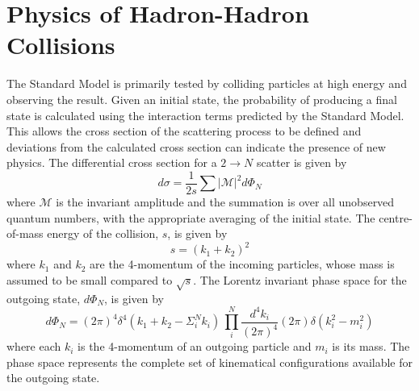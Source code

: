 \section{Physics of Hadron-Hadron Collisions}

The Standard Model is primarily tested by colliding particles at high energy and observing the result. Given an initial state, the probability of producing a final state is calculated using the interaction terms predicted by the Standard Model. This allows 
the cross section of the scattering process 
to be defined 
and deviations from the calculated cross section can indicate the presence of new physics. The differential cross section for a $2\rightarrow N$ scatter is given by
\begin{equation} \label{simplexs}
d \sigma = \frac{1}{2s} \sum |\mathcal{M}|^2 d\Phi_N
\end{equation}
where $\mathcal{M}$ is the invariant amplitude and the summation is over all unobserved quantum numbers, with the appropriate averaging of the initial state. The centre-of-mass energy of the collision, $s$, is given by
\begin{equation}
s= \left(k_1 + k_2 \right)^2
\end{equation}
where $k_1$ and $k_2$ are the 4-momentum of the incoming particles, whose mass is assumed to be small compared to $\sqrt{s}$. 
The Lorentz invariant phase space for the outgoing state, $d\Phi_N$, is given by
\begin{equation}
d\Phi_N = \left(2\pi \right)^4 \delta^4\left(k_{1} + k_2 - \Sigma_i^N k_i \right) \, 
\prod_{i}^{N} \frac{d^4 k_i}{\left(2\pi \right)^4} \left(2\pi\right) \delta \left(k_i^2 - m_i^2 \right)
\end{equation}
where each $k_i$ is the 4-momentum of an outgoing particle and $m_i$ is its mass.
The phase space represents the complete set of kinematical configurations available for the outgoing state.

